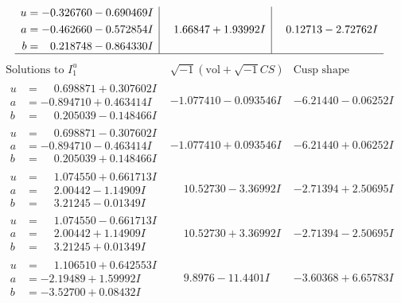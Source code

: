 \documentclass[1p]{elsarticle_modified}
\theoremstyle{definition}
\newcommand{\I}{\sqrt{-1}}
\begin{document}
$$\begin{array}{c|c|c}
\begin{aligned}
u &= -0.326760 - 0.690469 I \\
a &= -0.462660 - 0.572854 I \\
b &= \phantom{-}0.218748 - 0.864330 I\end{aligned}
 & \phantom{-}1.66847 + 1.93992 I & \phantom{-}0.12713 - 2.72762 I\\
 \hline 
 \end{array}$$\newpage$$\begin{array}{c|c|c}  
\text{Solutions to }I^u_{1}& \I (\text{vol} + \sqrt{-1}CS) & \text{Cusp shape}\\
 \hline 
\begin{aligned}
u &= \phantom{-}0.698871 + 0.307602 I \\
a &= -0.894710 + 0.463414 I \\
b &= \phantom{-}0.205039 - 0.148466 I\end{aligned}
 & -1.077410 - 0.093546 I & -6.21440 - 0.06252 I \\ \hline\begin{aligned}
u &= \phantom{-}0.698871 - 0.307602 I \\
a &= -0.894710 - 0.463414 I \\
b &= \phantom{-}0.205039 + 0.148466 I\end{aligned}
 & -1.077410 + 0.093546 I & -6.21440 + 0.06252 I \\ \hline\begin{aligned}
u &= \phantom{-}1.074550 + 0.661713 I \\
a &= \phantom{-}2.00442 - 1.14909 I \\
b &= \phantom{-}3.21245 - 0.01349 I\end{aligned}
 & \phantom{-}10.52730 - 3.36992 I & -2.71394 + 2.50695 I \\ \hline\begin{aligned}
u &= \phantom{-}1.074550 - 0.661713 I \\
a &= \phantom{-}2.00442 + 1.14909 I \\
b &= \phantom{-}3.21245 + 0.01349 I\end{aligned}
 & \phantom{-}10.52730 + 3.36992 I & -2.71394 - 2.50695 I \\ \hline\begin{aligned}
u &= \phantom{-}1.106510 + 0.642553 I \\
a &= -2.19489 + 1.59992 I \\
b &= -3.52700 + 0.08432 I\end{aligned}
 & \phantom{-}9.8976 - 11.4401 I & -3.60368 + 6.65783 I \\ \hline\begin{aligned}

\end{aligned}
\end{array}$$
\end{document}
